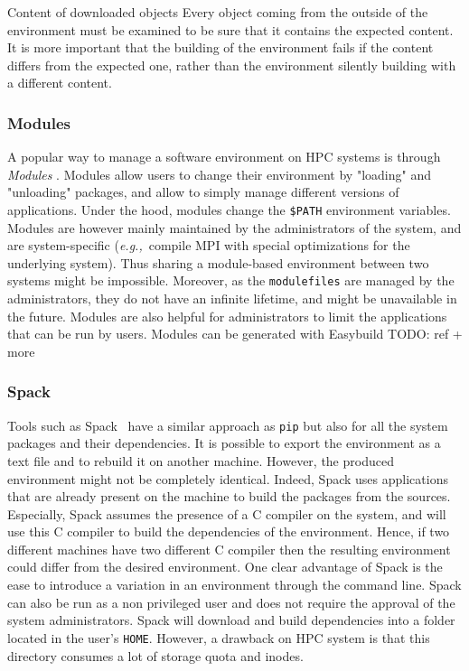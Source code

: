 \documentclass[sigconf]{acmart}
\newcommand{\eg}{\emph{e.g.,}}
\newcommand{\todo}[1]{{\color{red}TODO: #1}}
\begin{document}
\begin{lesson}{Content of downloaded objects}{}
Every object coming from the outside of the environment must be examined to be sure that it contains the expected content. 
It is more important that the building of the environment fails if the content differs from the expected one, rather than the environment silently building with a different content.
\end{lesson}

\subsubsection{Modules}

A popular way to manage a software environment on HPC systems is through \emph{Modules} \cite{modules}.
Modules allow users to change their environment by "loading" and "unloading" packages, and allow to simply manage different versions of applications. 
Under the hood, modules change the \texttt{\$PATH} environment variables.
Modules are however mainly maintained by the administrators of the system, and are system-specific (\eg\ compile MPI with special optimizations for the underlying system).
Thus sharing a module-based environment between two systems might be impossible.
Moreover, as the \texttt{modulefiles} are managed by the administrators, they do not have an infinite lifetime, and might be unavailable in the future.
Modules are also helpful for administrators to limit the applications that can be run by users.
Modules can be generated with Easybuild \todo{ref + more}

\subsubsection{Spack}

Tools such as Spack\ \cite{gamblin_spack_2015} have a similar approach as \texttt{pip} but also for all the system packages and their dependencies.
It is possible to export the environment as a text file and to rebuild it on another machine.
However, the produced environment might not be completely identical.
Indeed, Spack uses applications that are already present on the machine to build the packages from the sources.
Especially, Spack assumes the presence of a C compiler on the system, and will use this C compiler to build the dependencies of the environment.
Hence, if two different machines have two different C compiler then the resulting environment could differ from the desired environment.
One clear advantage of Spack is the ease to introduce a variation in an environment through the command line.
Spack can also be run as a non privileged user and does not require the approval of the system administrators.
Spack will download and build dependencies into a folder located in the user's \texttt{HOME}.
However, a drawback on HPC system is that this directory consumes a lot of storage quota and inodes.
\end{document}
